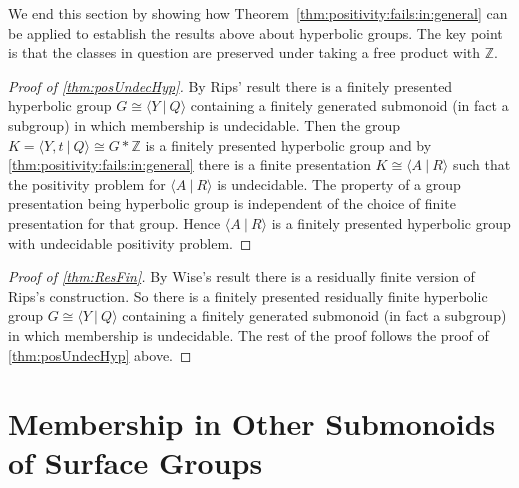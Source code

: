 \documentclass[11pt]{amsart}
\newcommand{\Gpres}[2]{\bigl\langle #1\:|\:#2 \bigr\rangle}
\newcommand{\Z}{\mathbb{Z}}
\theoremstyle{plain}
\theoremstyle{definition}
\begin{document}
We end this section by showing how Theorem~\ref{thm:positivity:fails:in:general} can be applied to establish the results above about hyperbolic groups. The key point is that the classes in question are preserved under taking a free product with $\Z$.  








\begin{proof}[Proof of \cref{thm:posUndecHyp}]
By Rips' result \cite{rips1982subgroups} there is a finitely presented hyperbolic group $G\cong \Gpres{Y}{Q}$ containing a finitely generated submonoid (in fact a subgroup) in which membership is undecidable. Then the group $K = \Gpres{Y,t}{Q} \cong G \ast  \Z$ is a finitely presented hyperbolic group and by \cref{thm:positivity:fails:in:general} there is a finite presentation $K \cong \Gpres{A}{R}$ such that the positivity problem for $\Gpres{A}{R}$ is undecidable. The property of a group presentation being hyperbolic group is independent of the choice of finite presentation for that group.
Hence $\Gpres{A}{R}$ is a finitely presented hyperbolic group with undecidable positivity problem.  
\end{proof}












\begin{proof}[Proof of \cref{thm:ResFin}]
By Wise's result \cite{wise2003residually} there is a residually finite version of Rips's construction. So there is a finitely presented residually finite hyperbolic group $G\cong \Gpres{Y}{Q}$ containing a finitely generated submonoid (in fact a subgroup) in which membership is undecidable. The rest of the proof follows the proof of \cref{thm:posUndecHyp} above.
\end{proof}























\section{Membership in Other Submonoids of Surface Groups}\label{sec:other}
\end{document}
